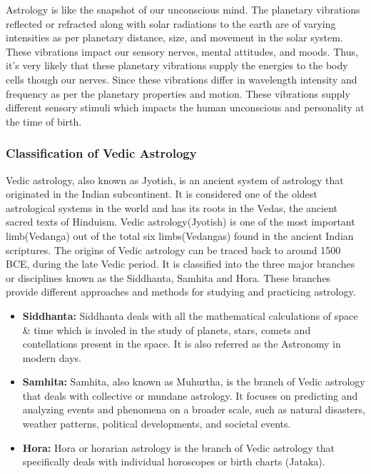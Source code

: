Astrology is like the snapshot of our unconscious mind. The planetary vibrations reflected or refracted along with solar radiations to the earth are of varying intensities as per planetary distance, size, and movement in the solar system. These vibrations impact our sensory nerves, mental attitudes, and moods. Thus, it’s very likely that these planetary vibrations supply the energies to the body cells though our nerves. Since these vibrations differ in wavelength intensity and frequency as per the planetary properties and motion. These vibrations supply different sensory stimuli which impacts the human unconscious and personality at the time of birth\cite{article1}.

\subsubsection{Classification of Vedic Astrology}
Vedic astrology, also known as Jyotish, is an ancient system of astrology that originated in the Indian subcontinent. It is considered one of the oldest astrological systems in the world and has its roots in the Vedas, the ancient sacred texts of Hinduism.
Vedic astrology(Jyotish) is one of the most important limb(Vedanga) out of the total six limbs(Vedangas) found in the ancient Indian scriptures. The origins of Vedic astrology can be traced back to around 1500 BCE, during the late Vedic period. It is classified into the three major branches or disciplines known as the Siddhanta, Samhita and Hora. These branches provide different approaches and methods for studying and practicing astrology.

\begin{itemize}
	\item \textbf{Siddhanta:} Siddhanta deals with all the mathematical calculations of space \& time which is involed in the study of planets, stars, comets and contellations present in the space. It is also referred as the Astronomy in modern days.
	\item \textbf{Samhita:} Samhita, also known as Muhurtha, is the branch of Vedic astrology that deals with collective or mundane astrology. It focuses on predicting and analyzing events and phenomena on a broader scale, such as natural disasters, weather patterns, political developments, and societal events.
	\item \textbf{Hora:} Hora or horarian astrology is the branch of Vedic astrology that specifically deals with individual horoscopes or birth charts (Jataka).
\end{itemize}

